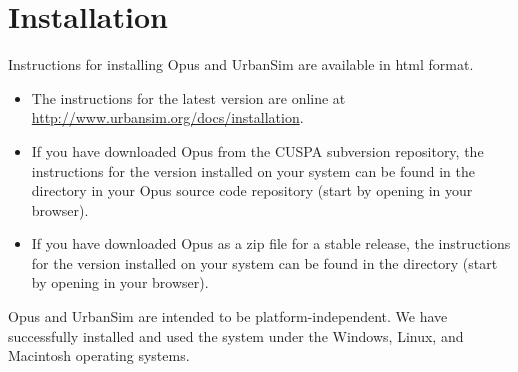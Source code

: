 
\chapter{Installation}
\label{chapter:installation}


Instructions for installing Opus and UrbanSim are available in html
format.  

\begin{itemize}

\item The instructions for the latest version are online at
\url{http://www.urbansim.org/docs/installation}.

\item If you have downloaded Opus from the CUSPA subversion repository, the
instructions for the version installed on your system can be found in the
directory  in your Opus source code repository (start
by opening  in your browser).

\item If you have downloaded Opus as a zip file for a stable release, the instructions for the
version installed on your system can be found in the directory
 (start by opening  in your browser).

\end{itemize}

Opus and UrbanSim are intended to be platform-independent.
 We have successfully installed and used the
system under the Windows, \windowsindex Linux, \linuxindex and Macintosh
\macintoshindex operating systems.


